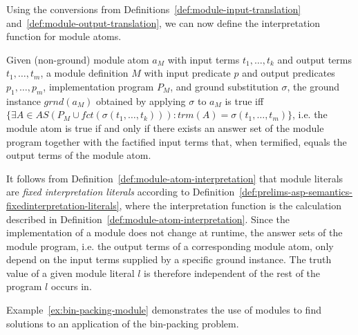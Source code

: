 Using the conversions from Definitions~\ref{def:module-input-translation} and~\ref{def:module-output-translation}, we can now define the interpretation function for module atoms.

\begin{definition}
\label{def:module-atom-interpretation}
Given (non-ground) module atom $a_M$ with input terms $t_1,\ldots,t_k$ and output terms $t_1,\ldots,t_m$, a module definition $M$ with input predicate $p$ and output predicates $p_1,\ldots,p_m$, implementation program $P_M$, and ground substitution $\sigma$, the ground instance $grnd(a_M)$ obtained by applying $\sigma$ to $a_M$ is true iff $\{\exists A \in AS(P_M \cup fct(\sigma(t_1,\ldots,t_k))): trm(A) = \sigma(t_{1},\ldots,t_m) \}$, i.e. the module atom is true if and only if there exists an answer set of the module program together with the factified input terms that, when termified, equals the output terms of the module atom.
\end{definition}	

\begin{corollary}
\label{cor:fixed-module-interpretation}
It follows from Definition~\ref{def:module-atom-interpretation} that module literals are \emph{fixed interpretation literals} according to Definition~\ref{def:prelims-asp-semantics-fixedinterpretation-literals}, where the interpretation function is the calculation described in Definition~\ref{def:module-atom-interpretation}. Since the implementation of a module does not change at runtime, the answer sets of the module program, i.e. the output terms of a corresponding module atom, only depend on the input terms supplied by a specific ground instance. The truth value of a given module literal $l$ is therefore independent of the rest of the program $l$ occurs in.
\end{corollary}

Example~\ref{ex:bin-packing-module} demonstrates the use of modules to find solutions to an application of the bin-packing problem.

